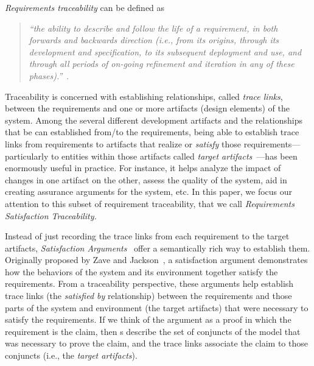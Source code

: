 \emph{Requirements traceability} can be defined as \\
\begin{quotation}
\textit{``the ability to describe and follow the life of a requirement, in both forwards and backwards direction (i.e., from its origins, through its development and specification, to its subsequent deployment and use, and through all periods of on-going refinement and iteration in any of these phases).''}~\cite{gotel}. \\
\end{quotation}


Traceability is concerned with establishing relationships, called \emph{trace links}, between the requirements and one or more artifacts (design elements) of the system.
Among the several different development artifacts and the relationships that be can established from/to the requirements, being able to establish trace links from requirements to artifacts that realize or \emph{satisfy} those requirements---particularly to entities within those artifacts called \emph{target artifacts}~\cite{gotel2012traceability}---has been enormously useful in practice.
For instance, it helps analyze the impact of changes in one artifact on the other, assess the quality of the system, aid in creating assurance arguments for the system, etc.
In this paper, we focus our attention to this subset of requirement traceability, that we call \emph{Requirements Satisfaction Traceability.}

Instead of just recording the trace links from each requirement to the target artifacts, \emph{Satisfaction Arguments}~\cite{zave1997four} offer a semantically rich way to establish them. Originally proposed by Zave and Jackson~\cite{zave1997four}, a satisfaction argument demonstrates how the behaviors of the system and its environment together satisfy the requirements. From a traceability perspective, these arguments help establish trace links (the \emph{satisfied by} relationship) between the requirements and those parts of the system and environment (the target artifacts) that were necessary to satisfy the requirements.  If we think of the argument as a proof in which the requirement is the claim, then \mivc s describe the set of conjuncts of the model that was necessary to prove the claim, and the trace links associate the claim to those conjuncts (i.e., the {\em target artifacts}).

